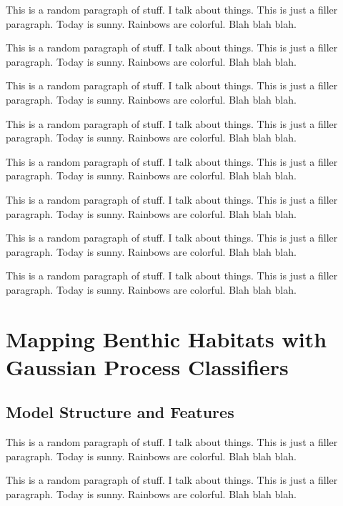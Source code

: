 \documentclass{article}
\begin{document}
		{\color{BurntOrange} This is a random paragraph of stuff. I talk about things. This is just a filler paragraph. Today is sunny. Rainbows are colorful. Blah blah blah.}
		
		{\color{BurntOrange} This is a random paragraph of stuff. I talk about things. This is just a filler paragraph. Today is sunny. Rainbows are colorful. Blah blah blah.}
		
		{\color{BurntOrange} This is a random paragraph of stuff. I talk about things. This is just a filler paragraph. Today is sunny. Rainbows are colorful. Blah blah blah.}
		
		{\color{BurntOrange} This is a random paragraph of stuff. I talk about things. This is just a filler paragraph. Today is sunny. Rainbows are colorful. Blah blah blah.}
		
		{\color{BurntOrange} This is a random paragraph of stuff. I talk about things. This is just a filler paragraph. Today is sunny. Rainbows are colorful. Blah blah blah.}
		
		{\color{BurntOrange} This is a random paragraph of stuff. I talk about things. This is just a filler paragraph. Today is sunny. Rainbows are colorful. Blah blah blah.}
		
		{\color{BurntOrange} This is a random paragraph of stuff. I talk about things. This is just a filler paragraph. Today is sunny. Rainbows are colorful. Blah blah blah.}
		
		{\color{BurntOrange} This is a random paragraph of stuff. I talk about things. This is just a filler paragraph. Today is sunny. Rainbows are colorful. Blah blah blah.}
			
\section{Mapping Benthic Habitats with Gaussian Process Classifiers}
\label{Section:BenthicMapping}

	\subsection{Model Structure and Features}
	
		{\color{BurntOrange} This is a random paragraph of stuff. I talk about things. This is just a filler paragraph. Today is sunny. Rainbows are colorful. Blah blah blah.}
		
		{\color{BurntOrange} This is a random paragraph of stuff. I talk about things. This is just a filler paragraph. Today is sunny. Rainbows are colorful. Blah blah blah.}
		
\end{document}
